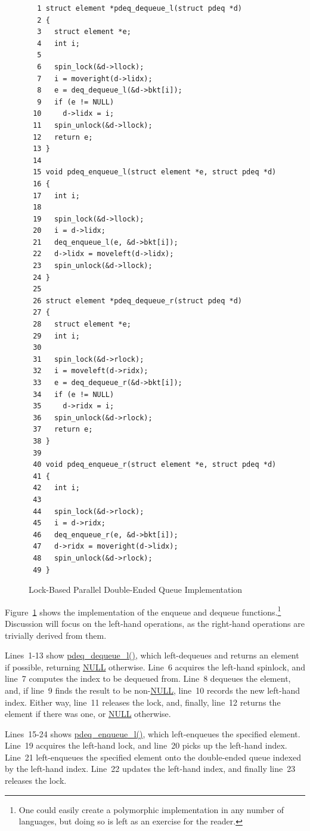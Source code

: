 \begin{figure}[bp]
{ \scriptsize
\begin{verbatim}
  1 struct element *pdeq_dequeue_l(struct pdeq *d)
  2 {
  3   struct element *e;
  4   int i;
  5 
  6   spin_lock(&d->llock);
  7   i = moveright(d->lidx);
  8   e = deq_dequeue_l(&d->bkt[i]);
  9   if (e != NULL)
 10     d->lidx = i;
 11   spin_unlock(&d->llock);
 12   return e;
 13 }
 14 
 15 void pdeq_enqueue_l(struct element *e, struct pdeq *d)
 16 {
 17   int i;
 18 
 19   spin_lock(&d->llock);
 20   i = d->lidx;
 21   deq_enqueue_l(e, &d->bkt[i]);
 22   d->lidx = moveleft(d->lidx);
 23   spin_unlock(&d->llock);
 24 }
 25 
 26 struct element *pdeq_dequeue_r(struct pdeq *d)
 27 {
 28   struct element *e;
 29   int i;
 30 
 31   spin_lock(&d->rlock);
 32   i = moveleft(d->ridx);
 33   e = deq_dequeue_r(&d->bkt[i]);
 34   if (e != NULL)
 35     d->ridx = i;
 36   spin_unlock(&d->rlock);
 37   return e;
 38 }
 39 
 40 void pdeq_enqueue_r(struct element *e, struct pdeq *d)
 41 {
 42   int i;
 43 
 44   spin_lock(&d->rlock);
 45   i = d->ridx;
 46   deq_enqueue_r(e, &d->bkt[i]);
 47   d->ridx = moveright(d->lidx);
 48   spin_unlock(&d->rlock);
 49 }
\end{verbatim}
}
\caption{Lock-Based Parallel Double-Ended Queue Implementation}
\label{fig:SMPdesign:Lock-Based Parallel Double-Ended Queue Implementation}
\end{figure}

Figure~\ref{fig:SMPdesign:Lock-Based Parallel Double-Ended Queue Implementation}
shows the implementation of the enqueue and dequeue functions.\footnote{
	One could easily create a polymorphic implementation in any
	number of languages, but doing so is left as an exercise for
	the reader.}
Discussion will focus on the left-hand operations, as the right-hand
operations are trivially derived from them.

Lines~1-13 show \url{pdeq_dequeue_l()}, which left-dequeues and returns
an element if possible, returning \url{NULL} otherwise.
Line~6 acquires the left-hand spinlock, and line~7 computes the
index to be dequeued from.
Line~8 dequeues the element, and, if line~9 finds the result to be
non-\url{NULL}, line~10 records the new left-hand index.
Either way, line~11 releases the lock, and, finally, line~12 returns
the element if there was one, or \url{NULL} otherwise.

Lines~15-24 shows \url{pdeq_enqueue_l()}, which left-enqueues the specified
element.
Line~19 acquires the left-hand lock, and line~20 picks up the left-hand
index.
Line~21 left-enqueues the specified element onto the double-ended queue
indexed by the left-hand index.
Line~22 updates the left-hand index, and finally line~23 releases the lock.

